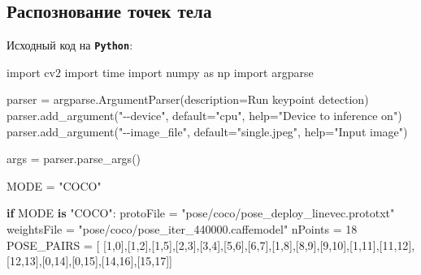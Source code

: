 \documentclass[
  12pt,
  a4paper,
]{article}
\newenvironment{Shaded}{}{}
\newcommand{\BuiltInTok}[1]{#1}
\newcommand{\ControlFlowTok}[1]{\textcolor[rgb]{0.00,0.44,0.13}{\textbf{#1}}}
\newcommand{\DecValTok}[1]{\textcolor[rgb]{0.25,0.63,0.44}{#1}}
\newcommand{\ImportTok}[1]{#1}
\newcommand{\KeywordTok}[1]{\textcolor[rgb]{0.00,0.44,0.13}{\textbf{#1}}}
\newcommand{\NormalTok}[1]{#1}
\newcommand{\OperatorTok}[1]{\textcolor[rgb]{0.40,0.40,0.40}{#1}}
\newcommand{\StringTok}[1]{\textcolor[rgb]{0.25,0.44,0.63}{#1}}
\begin{document}
\hypertarget{ux440ux430ux441ux43fux43eux437ux43dux43eux432ux430ux43dux438ux435-ux442ux43eux447ux435ux43a-ux442ux435ux43bux430}{%
\subsection{Распознование точек
тела}\label{ux440ux430ux441ux43fux43eux437ux43dux43eux432ux430ux43dux438ux435-ux442ux43eux447ux435ux43a-ux442ux435ux43bux430}}

Исходный код на \textbf{\texttt{Python}}:

\begin{Shaded}
\begin{Highlighting}[numbers=left,,]
\ImportTok{import}\NormalTok{ cv2}
\ImportTok{import}\NormalTok{ time}
\ImportTok{import}\NormalTok{ numpy }\ImportTok{as}\NormalTok{ np}
\ImportTok{import}\NormalTok{ argparse}

\NormalTok{parser }\OperatorTok{=}\NormalTok{ argparse.ArgumentParser(description}\OperatorTok{=}\StringTok{\textquotesingle{}Run keypoint detection\textquotesingle{}}\NormalTok{)}
\NormalTok{parser.add\_argument(}\StringTok{"{-}{-}device"}\NormalTok{, default}\OperatorTok{=}\StringTok{"cpu"}\NormalTok{, }\BuiltInTok{help}\OperatorTok{=}\StringTok{"Device to inference on"}\NormalTok{)}
\NormalTok{parser.add\_argument(}\StringTok{"{-}{-}image\_file"}\NormalTok{, default}\OperatorTok{=}\StringTok{"single.jpeg"}\NormalTok{, }\BuiltInTok{help}\OperatorTok{=}\StringTok{"Input image"}\NormalTok{)}

\NormalTok{args }\OperatorTok{=}\NormalTok{ parser.parse\_args()}


\NormalTok{MODE }\OperatorTok{=} \StringTok{"COCO"}

\ControlFlowTok{if}\NormalTok{ MODE }\KeywordTok{is} \StringTok{"COCO"}\NormalTok{:}
\NormalTok{    protoFile }\OperatorTok{=} \StringTok{"pose/coco/pose\_deploy\_linevec.prototxt"}
\NormalTok{    weightsFile }\OperatorTok{=} \StringTok{"pose/coco/pose\_iter\_440000.caffemodel"}
\NormalTok{    nPoints }\OperatorTok{=} \DecValTok{18}
\NormalTok{    POSE\_PAIRS }\OperatorTok{=}\NormalTok{ [ [}\DecValTok{1}\NormalTok{,}\DecValTok{0}\NormalTok{],[}\DecValTok{1}\NormalTok{,}\DecValTok{2}\NormalTok{],[}\DecValTok{1}\NormalTok{,}\DecValTok{5}\NormalTok{],[}\DecValTok{2}\NormalTok{,}\DecValTok{3}\NormalTok{],[}\DecValTok{3}\NormalTok{,}\DecValTok{4}\NormalTok{],[}\DecValTok{5}\NormalTok{,}\DecValTok{6}\NormalTok{],[}\DecValTok{6}\NormalTok{,}\DecValTok{7}\NormalTok{],[}\DecValTok{1}\NormalTok{,}\DecValTok{8}\NormalTok{],[}\DecValTok{8}\NormalTok{,}\DecValTok{9}\NormalTok{],[}\DecValTok{9}\NormalTok{,}\DecValTok{10}\NormalTok{],[}\DecValTok{1}\NormalTok{,}\DecValTok{11}\NormalTok{],[}\DecValTok{11}\NormalTok{,}\DecValTok{12}\NormalTok{],[}\DecValTok{12}\NormalTok{,}\DecValTok{13}\NormalTok{],[}\DecValTok{0}\NormalTok{,}\DecValTok{14}\NormalTok{],[}\DecValTok{0}\NormalTok{,}\DecValTok{15}\NormalTok{],[}\DecValTok{14}\NormalTok{,}\DecValTok{16}\NormalTok{],[}\DecValTok{15}\NormalTok{,}\DecValTok{17}\NormalTok{]]}


\end{Highlighting}
\end{Shaded}
\end{document}
